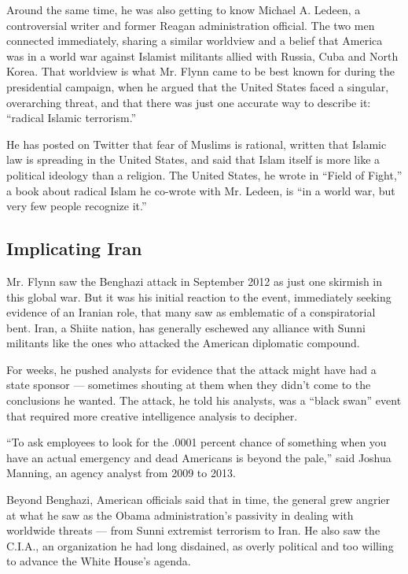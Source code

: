 Around the same time, he was also getting to know Michael A. Ledeen, a
controversial writer and former Reagan administration official. The two
men connected immediately, sharing a similar worldview and a belief that
America was in a world war against Islamist militants allied with
Russia, Cuba and North Korea. That worldview is what Mr. Flynn came to
be best known for during the presidential campaign, when he argued that
the United States faced a singular, overarching threat, and that there
was just one accurate way to describe it: ``radical Islamic terrorism.''

He has posted on Twitter that fear of Muslims is rational, written that
Islamic law is spreading in the United States, and said that Islam
itself is more like a political ideology than a religion. The United
States, he wrote in ``Field of Fight,'' a book about radical Islam he
co-wrote with Mr. Ledeen, is ``in a world war, but very few people
recognize it.''

\hypertarget{implicating-iran}{%
\subsection{Implicating Iran}\label{implicating-iran}}

Mr. Flynn saw the Benghazi attack in September 2012 as just one skirmish
in this global war. But it was his initial reaction to the event,
immediately seeking evidence of an Iranian role, that many saw as
emblematic of a conspiratorial bent. Iran, a Shiite nation, has
generally eschewed any alliance with Sunni militants like the ones who
attacked the American diplomatic compound.

For weeks, he pushed analysts for evidence that the attack might have
had a state sponsor --- sometimes shouting at them when they didn't come
to the conclusions he wanted. The attack, he told his analysts, was a
``black swan'' event that required more creative intelligence analysis
to decipher.

``To ask employees to look for the .0001 percent chance of something
when you have an actual emergency and dead Americans is beyond the
pale,'' said Joshua Manning, an agency analyst from 2009 to 2013.

Beyond Benghazi, American officials said that in time, the general grew
angrier at what he saw as the Obama administration's passivity in
dealing with worldwide threats --- from Sunni extremist terrorism to
Iran. He also saw the C.I.A., an organization he had long disdained, as
overly political and too willing to advance the White House's agenda.

